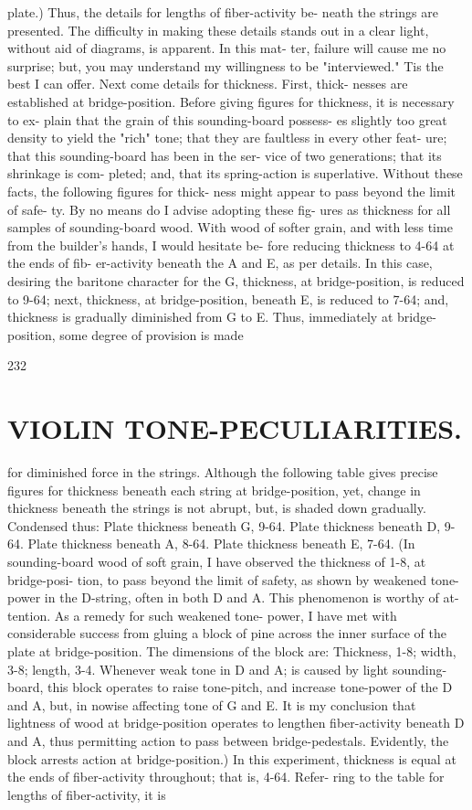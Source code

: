\documentclass{article}
\begin{document}
plate.) Thus, the details for lengths of fiber-activity be- neath the strings are presented. The difficulty in making these details stands out in a clear light, without aid of diagrams, is apparent. In this mat- ter, failure will cause me no surprise; but, you may understand my willingness to be "interviewed." Tis the best I can offer. Next come details for thickness. First, thick- nesses are established at bridge-position. Before giving figures for thickness, it is necessary to ex- plain that the grain of this sounding-board possess- es slightly too great density to yield the "rich" tone; that they are faultless in every other feat- ure; that this sounding-board has been in the ser- vice of two generations; that its shrinkage is com- pleted; and, that its spring-action is superlative. Without these facts, the following figures for thick- ness might appear to pass beyond the limit of safe- ty. By no means do I advise adopting these fig- ures as thickness for all samples of sounding-board wood. With wood of softer grain, and with less time from the builder's hands, I would hesitate be- fore reducing thickness to 4-64 at the ends of fib- er-activity beneath the A and E, as per details. In this case, desiring the baritone character for the G, thickness, at bridge-position, is reduced to 9-64; next, thickness, at bridge-position, beneath E, is reduced to 7-64; and, thickness is gradually diminished from G to E. Thus, immediately at bridge-position, some degree of provision is made

232

\section*{VIOLIN TONE-PECULIARITIES.}
for diminished force in the strings. Although the following table gives precise figures for thickness beneath each string at bridge-position, yet, change in thickness beneath the strings is not abrupt, but, is shaded down gradually. Condensed thus: Plate thickness beneath G, 9-64. Plate thickness beneath D, 9-64. Plate thickness beneath A, 8-64. Plate thickness beneath E, 7-64. (In sounding-board wood of soft grain, I have observed the thickness of 1-8, at bridge-posi- tion, to pass beyond the limit of safety, as shown by weakened tone-power in the D-string, often in both D and A. This phenomenon is worthy of at- tention. As a remedy for such weakened tone- power, I have met with considerable success from gluing a block of pine across the inner surface of the plate at bridge-position. The dimensions of the block are: Thickness, 1-8; width, 3-8; length, 3-4. Whenever weak tone in D and A; is caused by light sounding-board, this block operates to raise tone-pitch, and increase tone-power of the D and A, but, in nowise affecting tone of G and E. It is my conclusion that lightness of wood at bridge-position operates to lengthen fiber-activity beneath D and A, thus permitting action to pass between bridge-pedestals. Evidently, the block arrests action at bridge-position.) In this experiment, thickness is equal at the ends of fiber-activity throughout; that is, 4-64. Refer- ring to the table for lengths of fiber-activity, it is
\end{document}
